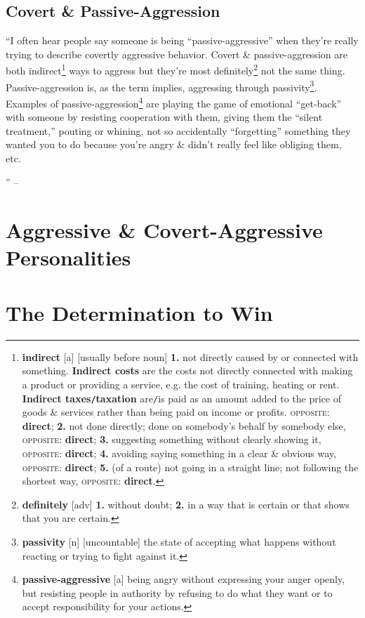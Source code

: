 \documentclass[oneside]{book}
\numberwithin{equation}{section}
\begin{document}
\subsection*{Covert \& Passive-Aggression}
``I often hear people say someone is being ``passive-aggressive'' when they're really trying to describe covertly aggressive behavior. Covert \& passive-aggression are both indirect\footnote{\textbf{indirect} [a] [usually before noun] \textbf{1.} not directly caused by or connected with something. \textbf{Indirect costs} are the costs not directly connected with making a product or providing a service, e.g. the cost of training, heating or rent. \textbf{Indirect taxes\texttt{/}taxation} are\texttt{/}is paid as an amount added to the price of goods \& services rather than being paid on income or profits. \textsc{opposite}: \textbf{direct}; \textbf{2.} not done directly; done on somebody's behalf by somebody else, \textsc{opposite}: \textbf{direct}; \textbf{3.} suggesting something without clearly showing it, \textsc{opposite}: \textbf{direct}; \textbf{4.} avoiding saying something in a clear \& obvious way, \textsc{opposite}: \textbf{direct}; \textbf{5.} (of a route) not going in a straight line; not following the shortest way, \textsc{opposite}: \textbf{direct}.} ways to aggress but they're most definitely\footnote{\textbf{definitely} [adv] \textbf{1.} without doubt; \textbf{2.} in a way that is certain or that shows that you are certain.} not the same thing. Passive-aggression is, as the term implies, aggressing through passivity\footnote{\textbf{passivity} [n] [uncountable] the state of accepting what happens without reacting or trying to fight against it.}. Examples of passive-aggression\footnote{\textbf{passive-aggressive} [a] being angry without expressing your anger openly, but resisting people in authority by refusing to do what they want or to accept responsibility for your actions.}  are playing the game of emotional ``get-back'' with someone by resisting cooperation with them, giving them the ``silent treatment,'' pouting or whining, not so accidentally ``forgetting'' something they wanted you to do because you're angry \& didn't really feel like obliging them, etc. 

'' -- \cite[Introduction]{Simon2010}

\section{Aggressive \& Covert-Aggressive Personalities}

\section{The Determination to Win}
\end{document}
